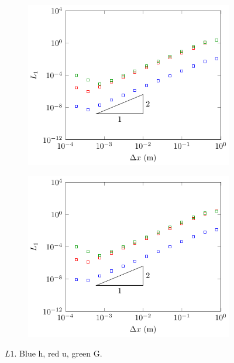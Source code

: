 \begin{figure}
\begin{subfigure}{0.5\textwidth}
		\includegraphics[width=\textwidth]{./chp5/figures/Analytic/Soliton/L1/D.pdf}
	\end{subfigure}%
	\begin{subfigure}{0.5\textwidth}
		\includegraphics[width=\textwidth]{./chp5/figures/Analytic/Soliton/L1/W.pdf}
	\end{subfigure}
	\caption{$L1$. Blue h, red u, green G.}
	\label{fig:SolitonL1All}
\end{figure}

